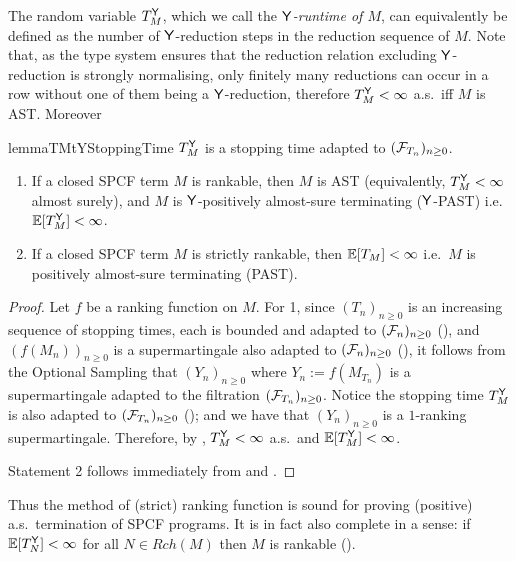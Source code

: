 
The random variable $T_M^{\mathsf{Y}}$, which we call the \emph{$\mathsf{Y}$-runtime of $M$}, can equivalently be defined as the number of $\mathsf{Y}$-reduction steps in the reduction sequence of $M$. 
Note that, as the type system ensures that the reduction relation excluding $\mathsf{Y}$-reduction is strongly normalising, only finitely many reductions can occur in a row without one of them being a $\mathsf{Y}$-reduction, therefore $T_M^{\mathsf{Y}} < \infty$ a.s.~iff $M$ is AST. 
Moreover 
\begin{restatable}{lemma}{TMtYStoppingTime}
\label{lem:TMtY is a stopping time}
$T_M^{\mathsf{Y}}$ is a stopping time adapted to $(\mathcal{F}_{T_n})_{n \geq 0}$.
\end{restatable}

\begin{theorem} \label{thm:rankable implies termination}
\begin{enumerate}
\item If a closed SPCF term $M$ is rankable, then $M$ is AST (equivalently, $T^{\mathsf{Y}}_M < \infty$ almost surely), and $M$ is $\mathsf{Y}$-positively almost-sure terminating ($\mathsf{Y}$-PAST) i.e.~$\mathbb{E}[T^{\mathsf{Y}}_M] < \infty$. 

\item If a closed SPCF term $M$ is strictly rankable, then $\mathbb{E}[T_M] < \infty$ i.e.~$M$ is positively almost-sure terminating (PAST).
\end{enumerate}
\end{theorem}

\begin{proof}
Let $f$ be a ranking function on $M$.
For 1, since $(T_n)_{n \geq 0}$ is an increasing sequence of stopping times, each is bounded and adapted to $(\mathcal{F}_n)_{n \geq 0}$ (),
and $(f(M_n))_{n \geq 0}$ is a supermartingale also adapted to $(\mathcal{F}_n)_{n \geq 0}$ (),
it follows from the Optional Sampling  that $(Y_n)_{n \geq 0}$ where $Y_n := f(M_{T_n})$ is a supermartingale adapted to the filtration $(\mathcal{F}_{T_n})_{n \geq 0}$.
Notice the stopping time $T_M^{\mathsf{Y}}$ is also adapted to $(\mathcal{F}_{T_n})_{n \geq 0}$ (); and we have that $(Y_n)_{n \geq 0}$ is a $1$-ranking supermartingale.
Therefore, by , $T^{\mathsf{Y}}_M < \infty$ a.s.~and $\mathbb{E}[T^{\mathsf{Y}}_M] < \infty$.

Statement 2 follows immediately from  and .
\end{proof}

Thus the method of (strict) ranking function is sound for proving (positive) a.s.~termination of SPCF programs.
It is in fact also complete in a sense: if $\mathbb{E}[T^{\mathsf{Y}}_N] < \infty$ for all $N \in \mathit{Rch}(M)$ then $M$ is rankable ().
